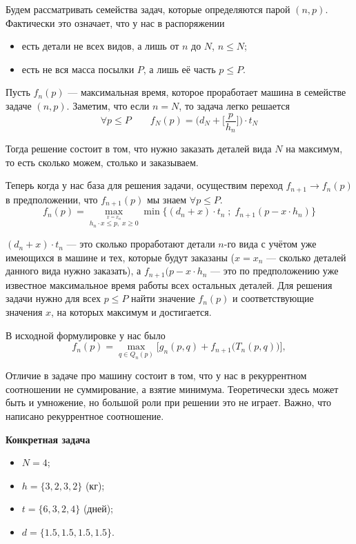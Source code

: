 \bigskip

Будем рассматривать семейства задач, которые определяются парой $(n, p)$. Фактически это означает, что у нас в распоряжении
\begin{itemize}[nosep]
	\item есть детали не всех видов, а лишь от $n$ до $N$, $n \le N$;
	
	\item есть не вся масса посылки $P$, а лишь её часть $p \le P$.
\end{itemize}

Пусть $f_n(p)$ --- максимальная время, которое проработает машина в семействе задаче $(n, p)$. Заметим, что если $n = N$, то задача легко решается
\[
\forall p \le P \qquad f_N(p) = \bigg(d_N + \bigg[\frac{p}{h_n}\bigg]\bigg) \cdot t_N
\]

Тогда решение состоит в том, что нужно заказать деталей вида $N$ на максимум, то есть сколько можем, столько и заказываем.

Теперь когда у нас база для решения задачи, осуществим переход $f_{n+1} \to f_n(p)$ в предположении, что $f_{n+1}(p)$ мы знаем $\forall p \le P$.
\[
\boxed{f_n(p) = \max_{\stackrel{x = x_n}{h_n \cdot x \le p, \; x \ge 0}} \min\Big\{(d_n + x) \cdot t_n \; ; \; f_{n+1}(p - x \cdot h_n)\Big\}}
\]

$(d_n + x) \cdot t_n$ --- это сколько проработают детали $n$-го вида с учётом уже имеющихся в машине и тех, которые будут заказаны ($x = x_n$ --- сколько деталей данного вида нужно заказать), а $f_{n+1}(p - x \cdot h_n$ --- это по предположению уже известное максимальное время работы всех остальных деталей. Для решения задачи нужно для всех $p \le P$ найти значение $f_n(p)$ и соответствующие значения $x$, на которых максимум и достигается.

В исходной формулировке у нас было
\[
f_n(p) = \max_{q \in Q_{n}(p)} \Big[g_n(p, q) + f_{n+1}\big(T_{n}(p, q)\big)\Big],
\]

Отличие в задаче про машину состоит в том, что у нас в рекуррентном соотношении не суммирование, а взятие минимума. Теоретически здесь может быть и умножение, но большой роли при решении это не играет. Важно, что написано рекуррентное соотношение.


\textbf{Конкретная задача}

\begin{itemize}
	\item $N = 4$;
	
	\item $h = \{3, 2, 3, 2\}$ (кг);
	
	\item $t = \{6, 3, 2, 4\}$ (дней);
	
	\item $d = \{1.5, 1.5, 1.5, 1.5\}$.
\end{itemize}

